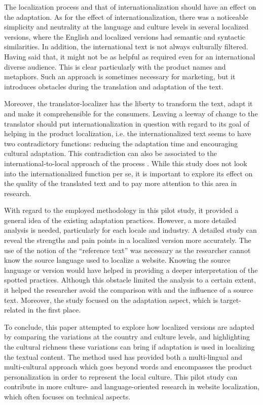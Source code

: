 \documentclass[output=paper]{langsci/langscibook}
\begin{document}
The localization process and that of internationalization should have an effect on the adaptation. As for the effect of internationalization, there was a noticeable simplicity and neutrality at the language and culture levels in several localized versions, where the English and localized versions had semantic and syntactic similarities. In addition, the international text is not always culturally filtered. Having said that, it might not be as helpful as required even for an international diverse audience. This is clear particularly with the product names and metaphors. Such an approach is sometimes necessary for marketing, but it introduces obstacles during the translation and adaptation of the text.

Moreover, the translator-localizer has the liberty to transform the text, adapt it and make it comprehensible for the consumers. Leaving a leeway of change to the translator should put internationalization in question with regard to its goal of helping in the product localization, i.e. the internationalized text seems to have two contradictory functions: reducing the adaptation time and encouraging cultural adaptation. This contradiction can also be associated to the international-to-local approach of the process \parencite{jimenez10}. While this study does not look into the internationalized function per se, it is important to explore its effect on the quality of the translated text and to pay more attention to this area in research.

With regard to the employed methodology in this pilot study, it provided a general idea of the existing adaptation practices. However, a more detailed analysis is needed, particularly for each locale and industry. A detailed study can reveal the strengths and pain points in a localized version more accurately. The use of the notion of the \enquote{reference text} was necessary as the researcher cannot know the source language used to localize a website. Knowing the source language or version would have helped in providing a deeper interpretation of the spotted practices. Although this obstacle limited the analysis to a certain extent, it helped the researcher avoid the comparison with and the influence of a source text. Moreover, the study focused on the adaptation aspect, which is target-related in the first place.

\hspace*{-1mm}To conclude, this paper attempted to explore how localized versions are adapted by comparing the variations at the country and culture levels, and highlighting the cultural richness these variations can bring if adaptation is used in localizing the textual content. The method used has provided both a multi-lingual and multi-cultural approach which goes beyond words and encompasses the product personalization in order to represent the local culture. This pilot study can contribute in more culture- and language-oriented research in website localization, which often focuses on technical aspects.
\end{document}
